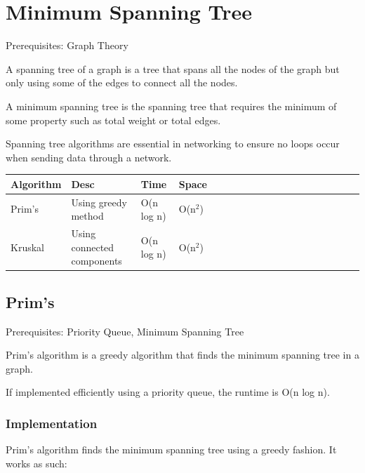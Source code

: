 \documentclass[11pt,oneside]{book}
\begin{document}
    \chapter{ Minimum Spanning Tree }
        

Prerequisites:  Graph Theory

A spanning tree of a graph is a tree that spans all the nodes of the graph but only using some of the edges to connect all the nodes.

A minimum spanning tree is the spanning tree that requires the minimum of some property such as total weight or total edges.

Spanning tree algorithms are essential in networking to ensure no loops occur when sending data through a network.


        

\begin{center}\begin{tabulary}{0.4\linewidth}{|l|l|l|l|l|l|l|l|l|l|l|l|l|l|l|l|l|l|l}\hline


  Algorithm &
  Desc &
  Time &
  Space\\
\hline


  Prim's &
  Using greedy method &
  O(n log n) &
  O(n$^{2}$)\\

  Kruskal &
  Using connected components &
  O(n log n) &
  O(n$^{2}$)\\

\hline\end{tabulary}\end{center}


        \section{ Prim's }
        

Prerequisites:  Priority Queue, Minimum Spanning Tree

Prim's algorithm is a greedy algorithm that finds the minimum spanning tree in a graph.

If implemented efficiently using a priority queue, the runtime is O(n log n).

\subsection{Implementation}

Prim's algorithm finds the minimum spanning tree using a greedy fashion. It works as such:
\end{document}

